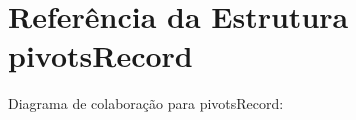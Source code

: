 \hypertarget{structpivotsRecord}{}\section{Referência da Estrutura pivots\+Record}
\label{structpivotsRecord}


Diagrama de colaboração para pivots\+Record\+:
